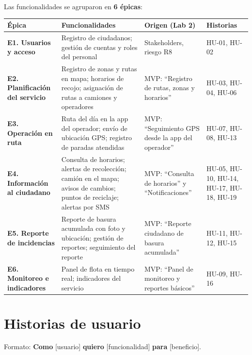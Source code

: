 \documentclass[11pt,a4paper]{article}
\begin{document}
Las funcionalidades se agruparon en \textbf{6 épicas}:

{\small
\begin{longtable}{L{2.8cm} L{5.2cm} L{4cm} L{2.4cm}}
\toprule
\textbf{Épica} & \textbf{Funcionalidades} & \textbf{Origen (Lab 2)} & \textbf{Historias} \\
\midrule
\endhead
\textbf{E1. Usuarios y acceso} & Registro de ciudadanos; gestión de cuentas y roles del personal & Stakeholders, riesgo R8 & HU-01, HU-02 \\
\textbf{E2. Planificación del servicio} & Registro de zonas y rutas en mapa; horarios de recojo; asignación de rutas a camiones y operadores & MVP: ``Registro de rutas, zonas y horarios'' & HU-03, HU-04, HU-06 \\
\textbf{E3. Operación en ruta} & Ruta del día en la app del operador; envío de ubicación GPS; registro de paradas atendidas & MVP: ``Seguimiento GPS desde la app del operador'' & HU-07, HU-08, HU-13 \\
\textbf{E4. Información al ciudadano} & Consulta de horarios; alertas de recolección; camión en el mapa; avisos de cambios; puntos de reciclaje; alertas por SMS & MVP: ``Consulta de horarios'' y ``Notificaciones'' & HU-05, HU-10, HU-14, HU-17, HU-18, HU-19 \\
\textbf{E5. Reporte de incidencias} & Reporte de basura acumulada con foto y ubicación; gestión de reportes; seguimiento del reporte & MVP: ``Reporte ciudadano de basura acumulada'' & HU-11, HU-12, HU-15 \\
\textbf{E6. Monitoreo e indicadores} & Panel de flota en tiempo real; indicadores del servicio & MVP: ``Panel de monitoreo y reportes básicos'' & HU-09, HU-16 \\
\bottomrule
\end{longtable}
}

\section{Historias de usuario}

Formato: \textbf{Como} [usuario] \textbf{quiero} [funcionalidad] \textbf{para} [beneficio].
\end{document}
